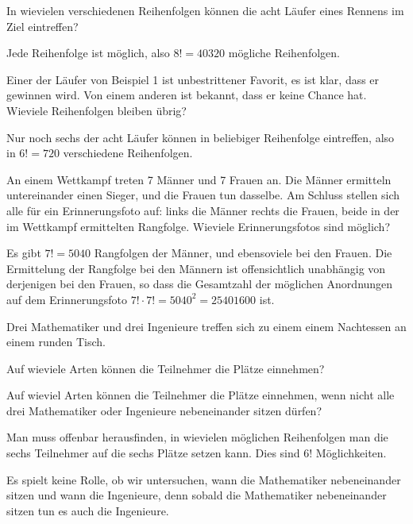\begin{beispiele}
\item In wievielen verschiedenen Reihenfolgen können die acht Läufer
eines Rennens im Ziel eintreffen?

\begin{loesung}
Jede Reihenfolge ist möglich, also $8!=40320$ mögliche Reihenfolgen.
\end{loesung}

\item Einer der Läufer von Beispiel 1 ist unbestrittener Favorit,
es ist klar, dass er gewinnen wird.
Von einem anderen ist bekannt, dass er keine Chance hat.
Wieviele Reihenfolgen bleiben übrig?

\begin{loesung}
Nur noch sechs der acht Läufer können in beliebiger Reihenfolge
eintreffen, also in $6!=720$ verschiedene Reihenfolgen.
\end{loesung}

\item An einem Wettkampf treten 7 Männer und 7 Frauen an.
Die Männer
ermitteln untereinander einen Sieger, und die Frauen tun dasselbe.
Am Schluss stellen sich alle für ein Erinnerungsfoto auf: links
die Männer rechts die Frauen, beide in der im Wettkampf ermittelten
Rangfolge.
Wieviele Erinnerungsfotos sind möglich?

\begin{loesung}
Es gibt $7!=5040$ Rangfolgen der Männer, und ebensoviele bei den
Frauen.
Die Ermittelung der Rangfolge bei den Männern ist offensichtlich
unabhängig von derjenigen bei den Frauen, so dass die Gesamtzahl der
möglichen Anordnungen auf dem Erinnerungsfoto $7!\cdot 7!=5040^2=25401600$
ist.
\end{loesung}

\item
\label{nachtessen}
Drei Mathematiker und drei Ingenieure treffen sich zu einem
einem Nachtessen an einem runden Tisch.
\begin{teilaufgaben}
\item
Auf wieviele Arten können die Teilnehmer die Plätze einnehmen?
\item
Auf wieviel Arten können 
die Teilnehmer die Plätze einnehmen, wenn nicht alle drei Mathematiker
oder Ingenieure nebeneinander sitzen dürfen?
\end{teilaufgaben}

\begin{loesung}
\begin{teilaufgaben}
\item
Man muss offenbar herausfinden, in wievielen möglichen Reihenfolgen
man die sechs Teilnehmer auf die sechs Plätze setzen kann.
Dies sind $6!$ Möglichkeiten.
\item
Es spielt keine Rolle, ob wir untersuchen, wann die Mathematiker 
nebeneinander sitzen und wann die Ingenieure, denn sobald die Mathematiker
nebeneinander sitzen tun es auch die Ingenieure.


\end{teilaufgaben}
\end{loesung}
\end{beispiele}

